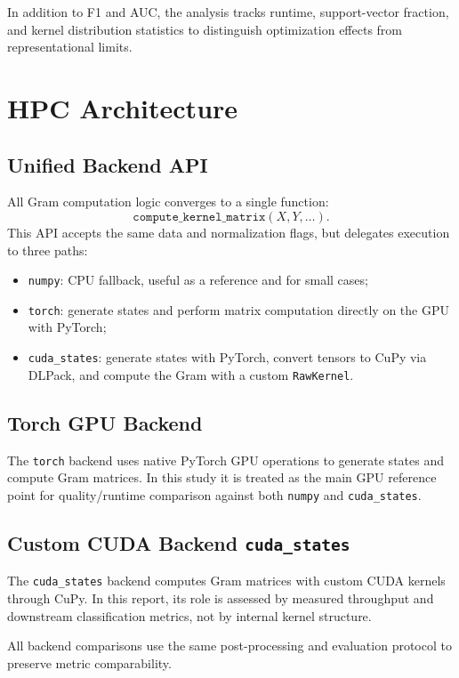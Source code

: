\documentclass[10pt,twocolumn,letterpaper]{article}
\begin{document}
In addition to F1 and AUC, the analysis tracks runtime, support-vector fraction, and kernel distribution statistics to distinguish optimization effects from representational limits.

\section{HPC Architecture}
\subsection{Unified Backend API}
All Gram computation logic converges to a single function:
\[
\texttt{compute\_kernel\_matrix}(X, Y, \ldots).
\]
This API accepts the same data and normalization flags, but delegates execution to three paths:
\begin{itemize}
    \item \texttt{numpy}: CPU fallback, useful as a reference and for small cases;
    \item \texttt{torch}: generate states and perform matrix computation directly on the GPU with PyTorch;
    \item \texttt{cuda\_states}: generate states with PyTorch, convert tensors to CuPy via DLPack, and compute the Gram with a custom \texttt{RawKernel}.
\end{itemize}

\subsection{Torch GPU Backend}
The \texttt{torch} backend uses native PyTorch GPU operations to generate states and compute Gram matrices. In this study it is treated as the main GPU reference point for quality/runtime comparison against both \texttt{numpy} and \texttt{cuda\_states}.

\subsection{Custom CUDA Backend \texttt{cuda\_states}}
The \texttt{cuda\_states} backend computes Gram matrices with custom CUDA kernels through CuPy. In this report, its role is assessed by measured throughput and downstream classification metrics, not by internal kernel structure.

All backend comparisons use the same post-processing and evaluation protocol to preserve metric comparability.
\end{document}
